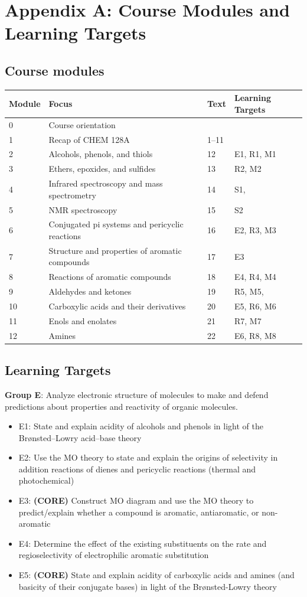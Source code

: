 \hypertarget{appendix-a}{%
\section{Appendix A: Course Modules and Learning
Targets}\label{appendix-a}}

\hypertarget{modules}{%
\subsection{Course modules}\label{modules}}

\begin{longtable}[]{@{}llll@{}}
\toprule
Module & Focus & Text & Learning Targets\tabularnewline
\midrule
\endhead
0 & Course orientation & &\tabularnewline
1 & Recap of CHEM 128A & 1--11 &\tabularnewline
2 & Alcohols, phenols, and thiols & 12 & E1, R1, M1\tabularnewline
3 & Ethers, epoxides, and sulfides & 13 & R2, M2\tabularnewline
4 & Infrared spectroscopy and mass spectrometry & 14 &
S1,\tabularnewline
5 & NMR spectroscopy & 15 & S2\tabularnewline
6 & Conjugated pi systems and pericyclic reactions & 16 & E2, R3,
M3\tabularnewline
7 & Structure and properties of aromatic compounds & 17 &
E3\tabularnewline
8 & Reactions of aromatic compounds & 18 & E4, R4, M4\tabularnewline
9 & Aldehydes and ketones & 19 & R5, M5,\tabularnewline
10 & Carboxylic acids and their derivatives & 20 & E5, R6,
M6\tabularnewline
11 & Enols and enolates & 21 & R7, M7\tabularnewline
12 & Amines & 22 & E6, R8, M8\tabularnewline
\bottomrule
\end{longtable}

\hypertarget{learning-targets}{%
\subsection{Learning Targets}\label{learning-targets}}

\textbf{Group E}: Analyze electronic structure of molecules to make and
defend predictions about properties and reactivity of organic molecules.

\begin{itemize}
\tightlist
\item
  E1: State and explain acidity of alcohols and phenols in light of the
  Brønsted--Lowry acid--base theory
\item
  E2: Use the MO theory to state and explain the origins of selectivity
  in addition reactions of dienes and pericyclic reactions (thermal and
  photochemical)
\item
  E3: \textbf{(CORE)} Construct MO diagram and use the MO theory to
  predict/explain whether a compound is aromatic, antiaromatic, or
  non-aromatic
\item
  E4: Determine the effect of the existing substituents on the rate and
  regioselectivity of electrophilic aromatic substitution
\item
  E5: \textbf{(CORE)} State and explain acidity of carboxylic acids and
  amines (and basicity of their conjugate bases) in light of the
  Brønsted-Lowry theory
\end{itemize}

